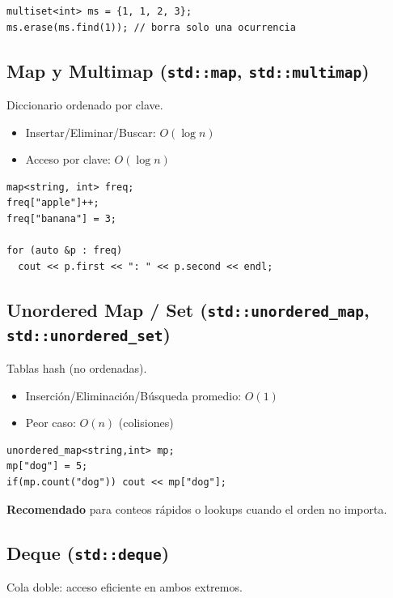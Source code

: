 \documentclass{article}
\begin{document}
\begin{lstlisting}[style=cppstyle]
multiset<int> ms = {1, 1, 2, 3};
ms.erase(ms.find(1)); // borra solo una ocurrencia
\end{lstlisting}


\subsection{Map y Multimap (\texttt{std::map}, \texttt{std::multimap})}

Diccionario ordenado por clave.

\begin{itemize}
  \item Insertar/Eliminar/Buscar: \(O(\log n)\)
  \item Acceso por clave: \(O(\log n)\)
\end{itemize}

\begin{lstlisting}[style=cppstyle]
map<string, int> freq;
freq["apple"]++;
freq["banana"] = 3;

for (auto &p : freq)
  cout << p.first << ": " << p.second << endl;
\end{lstlisting}


\subsection{Unordered Map / Set (\texttt{std::unordered\_map}, \texttt{std::unordered\_set})}

Tablas hash (no ordenadas).

\begin{itemize}
  \item Inserción/Eliminación/Búsqueda promedio: \(O(1)\)
  \item Peor caso: \(O(n)\) (colisiones)
\end{itemize}

\begin{lstlisting}[style=cppstyle]
unordered_map<string,int> mp;
mp["dog"] = 5;
if(mp.count("dog")) cout << mp["dog"];
\end{lstlisting}

\textbf{Recomendado} para conteos rápidos o lookups cuando el orden no importa.


\subsection{Deque (\texttt{std::deque})}

Cola doble: acceso eficiente en ambos extremos.
\end{document}
